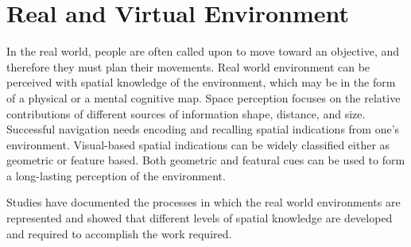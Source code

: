 \section{Real and Virtual Environment}
In the real world, people are often called upon to move toward an objective, and therefore they must plan their movements. Real world environment can be perceived with spatial knowledge of the environment, which may be in the form of a physical or a mental cognitive map. Space perception focuses on the relative contributions of different sources of information shape, distance, and size. Successful navigation needs encoding and recalling spatial indications from one's environment. Visual-based spatial indications can be widely classified either as geometric or feature based. Both geometric and featural cues can be used to form a long-lasting perception of the environment. \cite{fraser2000revealing} \par
Studies have documented the processes in which the real world environments are represented and showed that different levels of spatial knowledge are developed and required to accomplish the work required\cite{siegel1975development}. 

